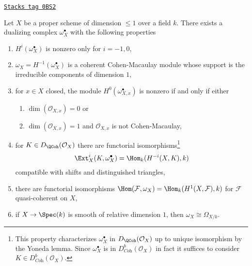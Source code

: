 \begin{lemma}
\label{curves-lemma-duality-dim-1}
\href{https://stacks.math.columbia.edu/tag/0BS2}{\texttt{Stacks tag 0BS2}}

Let $X$ be a proper scheme of dimension $\leq 1$ over a field $k$.
There exists a dualizing complex $\omega_X^\bullet$ with the
following properties
\begin{enumerate}
\item $H^i(\omega_X^\bullet)$ is nonzero only for $i = -1, 0$,
\item $\omega_X = H^{-1}(\omega_X^\bullet)$
is a coherent Cohen-Macaulay module whose support is the
irreducible components of dimension $1$,
\item for $x \in X$ closed, the module $H^0(\omega_{X, x}^\bullet)$
is nonzero if and only if either
\begin{enumerate}
\item $\dim(\mathcal{O}_{X, x}) = 0$ or
\item $\dim(\mathcal{O}_{X, x}) = 1$
and $\mathcal{O}_{X, x}$ is not Cohen-Macaulay,
\end{enumerate}
\item for $K \in D_\QCoh(\mathcal{O}_X)$ there are functorial
isomorphisms\footnote{This property
characterizes $\omega_X^\bullet$ in $D_\QCoh(\mathcal{O}_X)$
up to unique isomorphism by the Yoneda lemma. Since $\omega_X^\bullet$
is in $D^b_{\textit{Coh}}(\mathcal{O}_X)$ in fact it suffices to consider
$K \in D^b_{\textit{Coh}}(\mathcal{O}_X)$.}
$$
\Ext^i_X(K, \omega_X^\bullet) = \Hom_k(H^{-i}(X, K), k)
$$
compatible with shifts and distinguished triangles,
\item there are functorial isomorphisms
$\Hom(\mathcal{F}, \omega_X) = \Hom_k(H^1(X, \mathcal{F}), k)$
for $\mathcal{F}$ quasi-coherent on $X$,
\item if $X \to \Spec(k)$ is smooth of relative dimension $1$,
then $\omega_X \cong \Omega_{X/k}$.
\end{enumerate}
\end{lemma}


